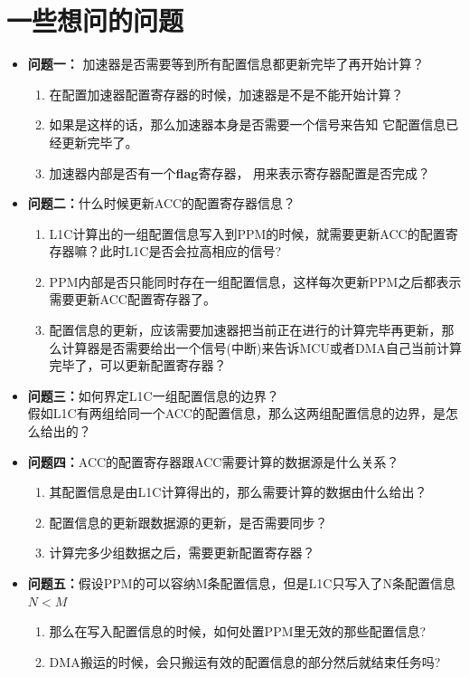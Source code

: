 \documentclass[a4paper, 12pt]{article}
\begin{document}
\section{一些想问的问题}%
\begin{itemize}
  \item \textbf{问题一：}
        加速器是否需要等到所有配置信息都更新完毕了再开始计算？
        \begin{enumerate}
          \item 在配置加速器配置寄存器的时候，加速器是不是不能开始计算？
          \item 如果是这样的话，那么加速器本身是否需要一个信号来告知
                它配置信息已经更新完毕了。
          \item 加速器内部是否有一个\textbf{flag}寄存器，
                用来表示寄存器配置是否完成？
        \end{enumerate}
  \item \textbf{问题二：}什么时候更新ACC的配置寄存器信息？
        \begin{enumerate}
          \item L1C计算出的一组配置信息写入到PPM的时候，就需要更新ACC的配置寄存器嘛？此时L1C是否会拉高相应的信号?
          \item PPM内部是否只能同时存在一组配置信息，这样每次更新PPM之后都表示需要更新ACC配置寄存器了。
          \item 配置信息的更新，应该需要加速器把当前正在进行的计算完毕再更新，那么计算器是否需要给出一个信号(中断)来告诉MCU或者DMA自己当前计算完毕了，可以更新配置寄存器？
        \end{enumerate}
  \item \textbf{问题三：}如何界定L1C一组配置信息的边界？\\假如L1C有两组给同一个ACC的配置信息，那么这两组配置信息的边界，是怎么给出的？
  \item \textbf{问题四：}ACC的配置寄存器跟ACC需要计算的数据源是什么关系？
        \begin{enumerate}
          \item 其配置信息是由L1C计算得出的，那么需要计算的数据由什么给出？
          \item 配置信息的更新跟数据源的更新，是否需要同步？
          \item 计算完多少组数据之后，需要更新配置寄存器？
        \end{enumerate}
  \item \textbf{问题五：}假设PPM的可以容纳M条配置信息，但是L1C只写入了N条配置信息$N < M$
    \begin{enumerate}
      \item 那么在写入配置信息的时候，如何处置PPM里无效的那些配置信息?
      \item DMA搬运的时候，会只搬运有效的配置信息的部分然后就结束任务吗?
    \end{enumerate}
\end{itemize}

\end{document}
